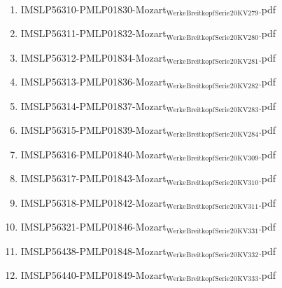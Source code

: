 \documentclass[11pt]{article}
\begin{document}
\begin{enumerate}
\begin{enumerate}
\item IMSLP56310-PMLP01830-Mozart$_{\text{Werke}}$$_{\text{Breitkopf}}$$_{\text{Serie}}$$_{\text{20}}$$_{\text{KV279}}$.pdf
\label{sec-1-1-1-1-44-49-6-5}

\item IMSLP56311-PMLP01832-Mozart$_{\text{Werke}}$$_{\text{Breitkopf}}$$_{\text{Serie}}$$_{\text{20}}$$_{\text{KV280}}$.pdf
\label{sec-1-1-1-1-44-49-6-6}

\item IMSLP56312-PMLP01834-Mozart$_{\text{Werke}}$$_{\text{Breitkopf}}$$_{\text{Serie}}$$_{\text{20}}$$_{\text{KV281}}$.pdf
\label{sec-1-1-1-1-44-49-6-7}

\item IMSLP56313-PMLP01836-Mozart$_{\text{Werke}}$$_{\text{Breitkopf}}$$_{\text{Serie}}$$_{\text{20}}$$_{\text{KV282}}$.pdf
\label{sec-1-1-1-1-44-49-6-8}

\item IMSLP56314-PMLP01837-Mozart$_{\text{Werke}}$$_{\text{Breitkopf}}$$_{\text{Serie}}$$_{\text{20}}$$_{\text{KV283}}$.pdf
\label{sec-1-1-1-1-44-49-6-9}

\item IMSLP56315-PMLP01839-Mozart$_{\text{Werke}}$$_{\text{Breitkopf}}$$_{\text{Serie}}$$_{\text{20}}$$_{\text{KV284}}$.pdf
\label{sec-1-1-1-1-44-49-6-10}

\item IMSLP56316-PMLP01840-Mozart$_{\text{Werke}}$$_{\text{Breitkopf}}$$_{\text{Serie}}$$_{\text{20}}$$_{\text{KV309}}$.pdf
\label{sec-1-1-1-1-44-49-6-11}

\item IMSLP56317-PMLP01843-Mozart$_{\text{Werke}}$$_{\text{Breitkopf}}$$_{\text{Serie}}$$_{\text{20}}$$_{\text{KV310}}$.pdf
\label{sec-1-1-1-1-44-49-6-12}

\item IMSLP56318-PMLP01842-Mozart$_{\text{Werke}}$$_{\text{Breitkopf}}$$_{\text{Serie}}$$_{\text{20}}$$_{\text{KV311}}$.pdf
\label{sec-1-1-1-1-44-49-6-13}

\item IMSLP56321-PMLP01846-Mozart$_{\text{Werke}}$$_{\text{Breitkopf}}$$_{\text{Serie}}$$_{\text{20}}$$_{\text{KV331}}$.pdf
\label{sec-1-1-1-1-44-49-6-14}

\item IMSLP56438-PMLP01848-Mozart$_{\text{Werke}}$$_{\text{Breitkopf}}$$_{\text{Serie}}$$_{\text{20}}$$_{\text{KV332}}$.pdf
\label{sec-1-1-1-1-44-49-6-15}

\item IMSLP56440-PMLP01849-Mozart$_{\text{Werke}}$$_{\text{Breitkopf}}$$_{\text{Serie}}$$_{\text{20}}$$_{\text{KV333}}$.pdf
\label{sec-1-1-1-1-44-49-6-16}


\end{enumerate}
\end{enumerate}
\end{document}

